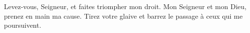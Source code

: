 Levez-vous, Seigneur, et faites triompher mon droit. Mon Seigneur et mon Dieu, prenez en main ma cause.
\versseparator
Tirez votre glaive et barrez le passage à ceux qui me poursuivent.
